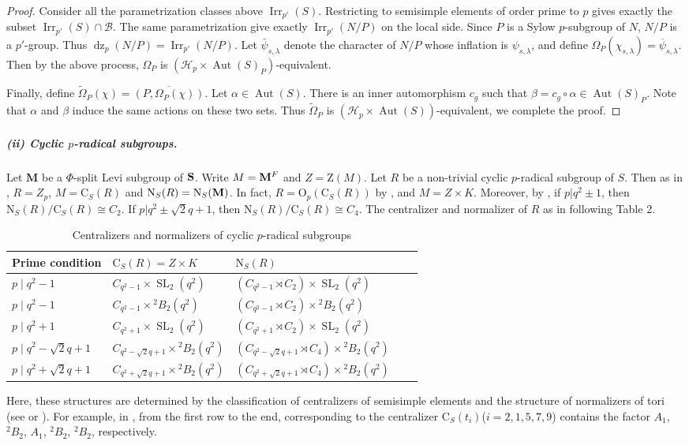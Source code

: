 \documentclass[11pt,a4paper]{article}
\numberwithin{equation}{section}
\theoremstyle{definition}
\theoremstyle{remark}
\newcommand{\Irr}{\operatorname{Irr}}
\newcommand{\Aut}{\operatorname{Aut}}
\newcommand{\SL}{\operatorname{SL}}
\newcommand{\dz}{\operatorname{dz}}
\newcommand{\OO}{\mathrm{O}}
\newcommand{\ZZ}{\mathrm{Z}}
\newcommand{\HH}{\mathcal H}
\newcommand{\NN}{\mathrm N}
\newcommand{\CC}{\mathrm C}
\begin{document}
\begin{proof}
Consider all the parametrization classes above  \(\Irr_{p'}(S)\). Restricting to semisimple elements of order prime to \(p\) gives exactly the subset $\Irr_{p'}(S)\cap \mathcal{B}$. The same parametrization give exactly \(\Irr_{p'}(N/P)\) on the local side. 
Since \(P\) is a Sylow \(p\)-subgroup of \(N\), 
\(N/P\) is a \(p'\)-group. Thus $\dz_p(N/P)=\Irr_{p'}(N/P)$. Let \(\bar\psi_{s,\lambda}\) denote the character of \(N/P\) whose inflation is \(\psi_{s,\lambda}\), and define $\Omega_P(\chi_{s,\lambda})=\overline\psi_{s,\lambda}$. Then by the above process, $\Omega_P$ is
$(\HH_p\times \Aut(S)_P)$-equivalent.

Finally, define 
$\widetilde\Omega_P(\chi)=\overline{(P,\Omega_P(\chi))}$. Let \(\alpha\in\Aut(S)\). There is an inner automorphism \(c_g\) such that $\beta=c_g\circ\alpha\in\Aut(S)_P$. Note that \(\alpha\) and \(\beta\) induce the same actions on these two sets. Thus $\widetilde \Omega_P$ is $(\HH_p\times \Aut(S))$-equivalent, we complete the proof.
\end{proof}

\subparagraph{(ii) Cyclic $p$-radical subgroups.} 
Let $\mathbf{M}$ be a $\Phi$-split Levi subgroup of $\bf S$. Write $M={\bf M}^F$ and $Z=\ZZ(M)$. Let $R$ be a non-trivial cyclic $p$-radical subgroup of $S$. Then as in \cite[Section 3]{Malle}, $R=Z_p$, $M=\CC_{S}(R)$ and $\NN_{S}(R)=\NN_{S}({\bf M})$. 
In fact,  $R=\OO_p(\CC_S(R))$ by \cite[(2B)-(a)]{An},
and $M=Z\times K$. Moreover, by \cite[TABLE I]{An}, if $p|q^2\pm 1$, then $\NN_S(R)/\CC_S(R)\cong C_2$. If  $p|q^2\pm\sqrt{2}q+1$, then $\NN_S(R)/\CC_S(R)\cong C_4$.
The centralizer and normalizer of $R$ as in following Table 2. 
\begin{table}[ht]
\centering
\caption{Centralizers and normalizers of cyclic $p$-radical subgroups}\label{tab:2}
\begin{tabular}{@{}lllrr@{}}
\toprule
Prime condition & $\CC_S(R)=Z\times K$ & $\NN_S(R)$\\
\midrule
$p\mid q^2-1$ & $C_{q^2-1}\times\SL_2(q^2)$ & $(C_{q^2-1}\rtimes C_2)\times\SL_2(q^2)$\\
$p\mid q^2-1$ & $C_{q^2-1}\times{}^2B_2(q^2)$ & $(C_{q^2-1}\rtimes C_2)\times{}^2B_2(q^2)$\\
$p\mid q^2+1$ & $C_{q^2+1}\times\SL_2(q^2)$ & $(C_{q^2+1}\rtimes C_2)\times\SL_2(q^2)$\\
$p\mid q^2-\sqrt{2}q+1$ & $C_{q^2-\sqrt{2}q+1}\times{}^2B_2(q^2)$ & $(C_{q^2-\sqrt{2}q+1}\rtimes C_4)\times{}^2B_2(q^2)$\\
$p\mid q^2+\sqrt{2}q+1$ & $C_{q^2+\sqrt{2}q+1}\times{}^2B_2(q^2)$ & $(C_{q^2+\sqrt{2}q+1}\rtimes C_4)\times{}^2B_2(q^2)$\\
\bottomrule
\end{tabular}
\end{table}
Here, these structures are determined by the classification of centralizers of semisimple elements and the structure of  normalizers of tori (see \cite[TABLE I]{An} or \cite[Tables~B.9--B.10]{HH}). For example, in \cite[TABLE I]{An},  from the first row to the end, 
corresponding to the centralizer $\CC_{S}(t_i)$($i=2,1,5,7,9$) contains the factor $A_1$, ${}^2B_2$, $A_1$, ${}^2B_2$, ${}^2B_2$, respectively. 
\end{document}
